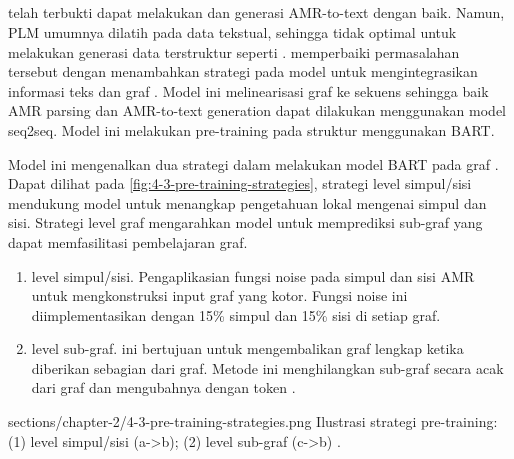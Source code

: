 \subsection{ }

 telah terbukti dapat melakukan  \amrparsing{} dan generasi AMR-to-text dengan baik.
Namun, \gls{PLM} umumnya dilatih pada data tekstual, sehingga tidak optimal untuk melakukan generasi data terstruktur seperti \AMR{}.
\textcite{bai2022} memperbaiki permasalahan tersebut dengan menambahkan strategi \pretraining{} pada model untuk mengintegrasikan informasi teks dan graf \AMR{}.
Model ini melinearisasi graf \AMR{} ke sekuens sehingga baik AMR parsing dan AMR-to-text generation dapat dilakukan menggunakan model \gls{seq2seq}.
Model ini melakukan pre-training pada struktur \AMR{} menggunakan \gls{BART}.


Model ini mengenalkan dua strategi  dalam melakukan \pretraining{} model \gls{BART} pada graf \AMR{}.
Dapat dilihat pada \cref{fig:4-3-pre-training-strategies}, strategi level  simpul/sisi mendukung model untuk menangkap pengetahuan lokal mengenai simpul dan sisi.
Strategi  level graf mengarahkan model untuk memprediksi sub-graf yang dapat memfasilitasi pembelajaran graf.
\begin{enumerate}
  \item {} level simpul/sisi.
  Pengaplikasian fungsi noise pada simpul dan sisi AMR untuk mengkonstruksi input graf yang kotor.
  Fungsi noise ini diimplementasikan dengan  15\% simpul dan 15\% sisi di setiap graf.

  \item {} level sub-graf.
   ini bertujuan untuk mengembalikan graf lengkap ketika diberikan sebagian dari graf.
  Metode ini menghilangkan sub-graf secara acak dari graf dan mengubahnya dengan token .
\end{enumerate}

  {sections/chapter-2/4-3-pre-training-strategies.png}
  {Ilustrasi strategi pre-training: (1)  level simpul/sisi (a->b); (2)  level sub-graf (c->b) .}
